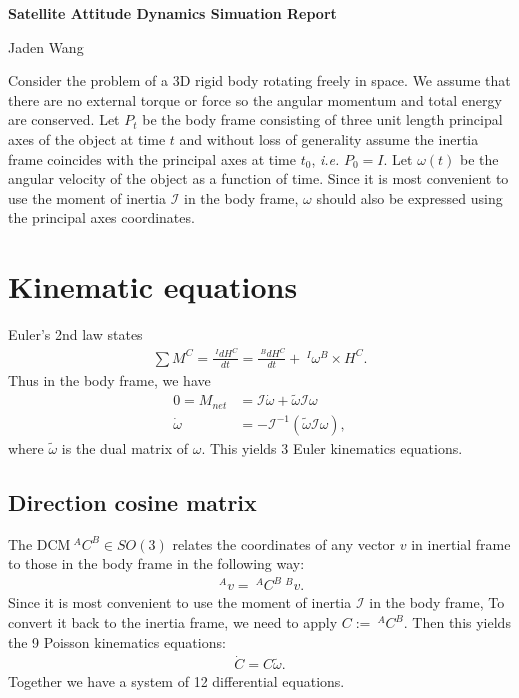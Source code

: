 \documentclass[12pt]{article}
\begin{document}
\centerline {\textsf{\textbf{\LARGE{Satellite Attitude Dynamics Simuation Report}}}}
\centerline {Jaden Wang}

Consider the problem of a 3D rigid body rotating freely in space. We assume that there are no external torque or force so the angular momentum and total energy are conserved. Let $ P_t$ be the body frame consisting of three unit length principal axes of the object at time $ t$ and without loss of generality assume the inertia frame coincides with the principal axes at time $ t_0$, \emph{i.e.} $ P_0 = I$. Let $ \omega(t)$ be the angular velocity of the object as a function of time. Since it is most convenient to use the moment of inertia $ \mathcal{ I}$ in the body frame, $ \omega$ should also be expressed using the principal axes coordinates.
\section{Kinematic equations}
Euler's 2nd law states
\begin{align*}
	\sum M^{C} = \frac{\ ^IdH^{C}}{ dt} = \frac{\ ^BdH^{C}}{ dt} + \ ^I \omega^{B} \times H^{C} .
\end{align*}
Thus in the body frame, we have
\begin{align*}
	0=M_{net} &= \mathcal{ I} \dot{\omega} + \widetilde{ \omega} \mathcal{ I} \omega \\
	\dot{\omega} &= -\mathcal{ I}^{-1} (\widetilde{ \omega} \mathcal{ I} \omega ),
\end{align*}
where $ \widetilde{ \omega}$ is the dual matrix of $ \omega$. This yields 3 Euler kinematics equations.
\subsection{Direction cosine matrix}
The DCM$\ ^AC^B \in SO(3)$ relates the coordinates of any vector $ v$ in inertial frame to those in the body frame in the following way:
\begin{align*}
	\ ^Av = \ ^AC^B \ ^Bv  .
\end{align*}
Since it is most convenient to use the moment of inertia $ \mathcal{ I}$ in the body frame,  To convert it back to the inertia frame, we need to apply $ C:= \ ^AC^B$. Then this yields the 9 Poisson kinematics equations:
\begin{align*}
	\dot{C} = C \widetilde{ \omega}.
\end{align*}
Together we have a system of 12 differential equations.
\end{document}
